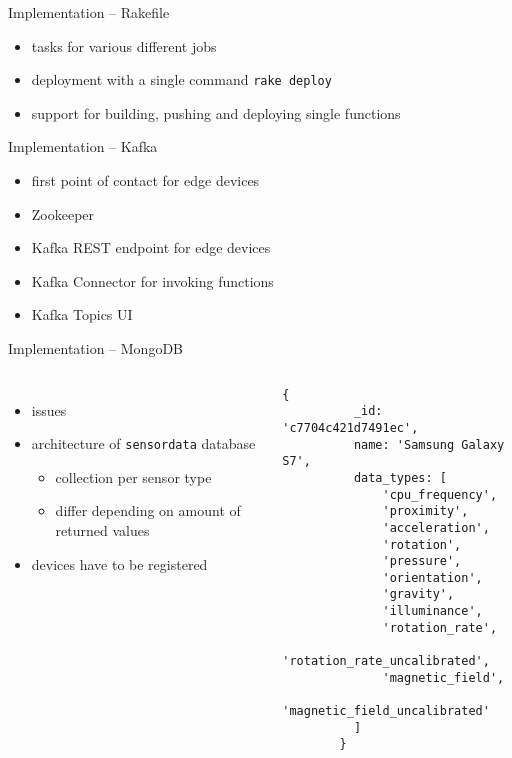 \begin{frame}{Implementation -- Rakefile}
  \begin{itemize}
    \item tasks for various different jobs
    \item deployment with a single command \lstinline{rake deploy}
    \item support for building, pushing and deploying single functions
  \end{itemize}
\end{frame}

\begin{frame}{Implementation -- Kafka}
  \begin{itemize}
    \item first point of contact for edge devices
    \item Zookeeper
    \item Kafka REST endpoint for edge devices
    \item Kafka Connector for invoking functions
    \item Kafka Topics UI
  \end{itemize}
\end{frame}

\begin{frame}[fragile]{Implementation -- MongoDB}
  \begin{columns}
      \begin{itemize}
        \item issues
        \item architecture of \texttt{sensordata} database
          \begin{itemize}
            \item collection per sensor type
            \item differ depending on amount of returned values
          \end{itemize}
        \item devices have to be registered
      \end{itemize}
        \begin{lstlisting}[language=mongo, basicstyle=\scriptsize\ttfamily]
        {
          _id: 'c7704c421d7491ec',
          name: 'Samsung Galaxy S7',
          data_types: [
              'cpu_frequency',
              'proximity',
              'acceleration',
              'rotation',
              'pressure',
              'orientation',
              'gravity',
              'illuminance',
              'rotation_rate',
              'rotation_rate_uncalibrated',
              'magnetic_field',
              'magnetic_field_uncalibrated'
          ]
        }
        \end{lstlisting}
   \end{columns}
\end{frame}


